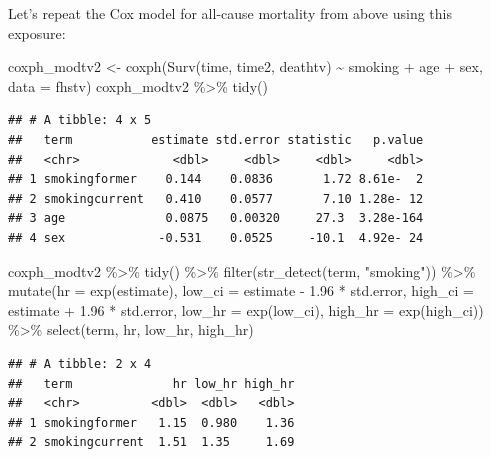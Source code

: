 \documentclass[
]{book}
\newenvironment{Shaded}{\begin{snugshade}}{\end{snugshade}}
\newcommand{\AttributeTok}[1]{\textcolor[rgb]{0.77,0.63,0.00}{#1}}
\newcommand{\FloatTok}[1]{\textcolor[rgb]{0.00,0.00,0.81}{#1}}
\newcommand{\FunctionTok}[1]{\textcolor[rgb]{0.00,0.00,0.00}{#1}}
\newcommand{\NormalTok}[1]{#1}
\newcommand{\OtherTok}[1]{\textcolor[rgb]{0.56,0.35,0.01}{#1}}
\newcommand{\SpecialCharTok}[1]{\textcolor[rgb]{0.00,0.00,0.00}{#1}}
\newcommand{\StringTok}[1]{\textcolor[rgb]{0.31,0.60,0.02}{#1}}
\begin{document}
Let's repeat the Cox model for all-cause mortality from above using this exposure:

\begin{Shaded}
\begin{Highlighting}[]
\NormalTok{coxph\_modtv2 }\OtherTok{\textless{}{-}} \FunctionTok{coxph}\NormalTok{(}\FunctionTok{Surv}\NormalTok{(time, time2, deathtv) }\SpecialCharTok{\textasciitilde{}}\NormalTok{ smoking }\SpecialCharTok{+}\NormalTok{ age }\SpecialCharTok{+}\NormalTok{ sex, }
                    \AttributeTok{data =}\NormalTok{ fhstv)}
\NormalTok{coxph\_modtv2 }\SpecialCharTok{\%\textgreater{}\%}
  \FunctionTok{tidy}\NormalTok{()}
\end{Highlighting}
\end{Shaded}

\begin{verbatim}
## # A tibble: 4 x 5
##   term           estimate std.error statistic   p.value
##   <chr>             <dbl>     <dbl>     <dbl>     <dbl>
## 1 smokingformer    0.144    0.0836       1.72 8.61e-  2
## 2 smokingcurrent   0.410    0.0577       7.10 1.28e- 12
## 3 age              0.0875   0.00320     27.3  3.28e-164
## 4 sex             -0.531    0.0525     -10.1  4.92e- 24
\end{verbatim}

\begin{Shaded}
\begin{Highlighting}[]
\NormalTok{coxph\_modtv2 }\SpecialCharTok{\%\textgreater{}\%} 
  \FunctionTok{tidy}\NormalTok{() }\SpecialCharTok{\%\textgreater{}\%} 
  \FunctionTok{filter}\NormalTok{(}\FunctionTok{str\_detect}\NormalTok{(term, }\StringTok{"smoking"}\NormalTok{)) }\SpecialCharTok{\%\textgreater{}\%} 
  \FunctionTok{mutate}\NormalTok{(}\AttributeTok{hr =} \FunctionTok{exp}\NormalTok{(estimate),}
         \AttributeTok{low\_ci =}\NormalTok{ estimate }\SpecialCharTok{{-}} \FloatTok{1.96} \SpecialCharTok{*}\NormalTok{ std.error, }
         \AttributeTok{high\_ci =}\NormalTok{ estimate }\SpecialCharTok{+} \FloatTok{1.96} \SpecialCharTok{*}\NormalTok{ std.error, }
         \AttributeTok{low\_hr =} \FunctionTok{exp}\NormalTok{(low\_ci), }
         \AttributeTok{high\_hr =} \FunctionTok{exp}\NormalTok{(high\_ci)) }\SpecialCharTok{\%\textgreater{}\%} 
  \FunctionTok{select}\NormalTok{(term, hr, low\_hr, high\_hr)}
\end{Highlighting}
\end{Shaded}

\begin{verbatim}
## # A tibble: 2 x 4
##   term              hr low_hr high_hr
##   <chr>          <dbl>  <dbl>   <dbl>
## 1 smokingformer   1.15  0.980    1.36
## 2 smokingcurrent  1.51  1.35     1.69
\end{verbatim}
\end{document}
